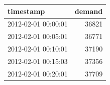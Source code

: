 \begin{tabular}{lr}
\toprule
 timestamp &  demand \\
\midrule
 2012-02-01 00:00:01 & 36821 \\
 2012-02-01 00:05:01 & 36771 \\
 2012-02-01 00:10:01 & 37190 \\
 2012-02-01 00:15:03 & 37356 \\
 2012-02-01 00:20:01 & 37709 \\
\bottomrule
\end{tabular}
